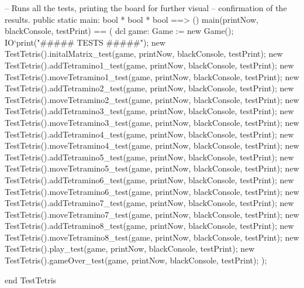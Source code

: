 \begin{vdmpp}[breaklines=true]
  -- Runs all the tests, printing the board for further visual 
  -- confirmation of the results.
  public static main: bool * bool * bool ==> ()
  main(printNow, blackConsole, testPrint) == (
   dcl game: Game := new Game();
   IO`print("\n##### TESTS #####\n");
   new TestTetris().initalMatrix_test(game, printNow, blackConsole, testPrint);
   new TestTetris().addTetramino1_test(game, printNow, blackConsole, testPrint);
   new TestTetris().moveTetramino1_test(game, printNow, blackConsole, testPrint);
   new TestTetris().addTetramino2_test(game, printNow, blackConsole, testPrint);
   new TestTetris().moveTetramino2_test(game, printNow, blackConsole, testPrint);
   new TestTetris().addTetramino3_test(game, printNow, blackConsole, testPrint);
   new TestTetris().moveTetramino3_test(game, printNow, blackConsole, testPrint);
   new TestTetris().addTetramino4_test(game, printNow, blackConsole, testPrint);
   new TestTetris().moveTetramino4_test(game, printNow, blackConsole, testPrint);
   new TestTetris().addTetramino5_test(game, printNow, blackConsole, testPrint);
   new TestTetris().moveTetramino5_test(game, printNow, blackConsole, testPrint);
   new TestTetris().addTetramino6_test(game, printNow, blackConsole, testPrint);
   new TestTetris().moveTetramino6_test(game, printNow, blackConsole, testPrint);
   new TestTetris().addTetramino7_test(game, printNow, blackConsole, testPrint);
   new TestTetris().moveTetramino7_test(game, printNow, blackConsole, testPrint);
   new TestTetris().addTetramino8_test(game, printNow, blackConsole, testPrint);
   new TestTetris().moveTetramino8_test(game, printNow, blackConsole, testPrint);
   new TestTetris().play_test(game, printNow, blackConsole, testPrint);
   new TestTetris().gameOver_test(game, printNow, blackConsole, testPrint);
  );
  
end TestTetris
\end{vdmpp}
